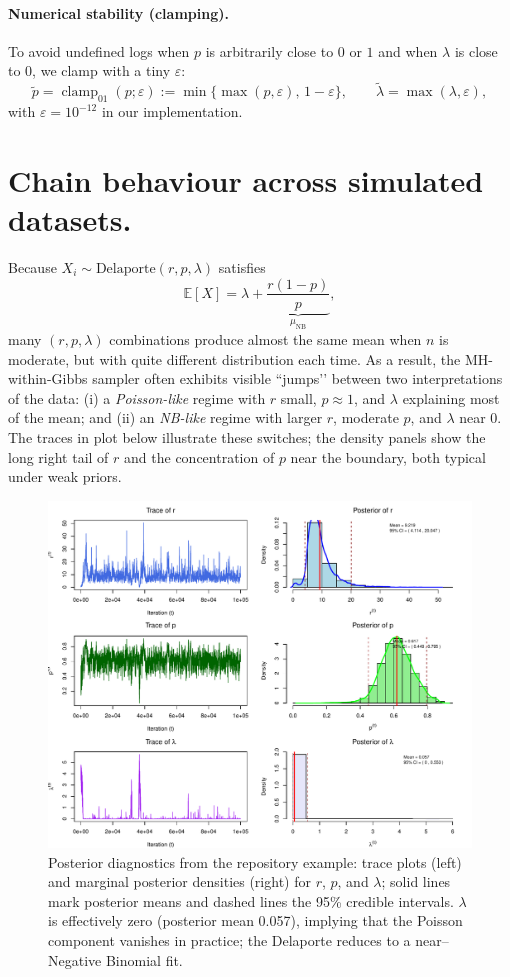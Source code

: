 \documentclass[11pt,a4paper]{article}
\theoremstyle{definition}
\theoremstyle{remark}
\newcommand{\NB}{\mathrm{NB}}
\begin{document}
\begin{enumerate}
    \paragraph{Numerical stability (clamping).}
    To avoid undefined logs when $p$ is arbitrarily close to $0$ or $1$ and when $\lambda$ is close to $0$, we clamp with a tiny $\varepsilon$:
    \[
    \tilde p=\operatorname{clamp}_{01}(p;\varepsilon):=\min\{\max(p,\varepsilon),\,1-\varepsilon\}, 
    \qquad
    \tilde\lambda=\max(\lambda,\varepsilon),
    \]
    with $\varepsilon=10^{-12}$ in our implementation. 
    \end{enumerate}

\section{Chain behaviour across simulated datasets.}
Because $X_i \sim \mathrm{Delaporte}(r,p,\lambda)$ satisfies
\[
\mathbb{E}[X]=\lambda + \underbrace{\frac{r(1-p)}{p}}_{\mu_{\NB}},
\]
many $(r,p,\lambda)$ combinations produce almost the same mean when $n$ is moderate, but with quite different distribution each time.
As a result, the MH-within-Gibbs sampler often exhibits visible ``jumps’’ between two
interpretations of the data:
(i) a \emph{Poisson-like} regime with $r$ small, $p\approx 1$, and $\lambda$ explaining most of
the mean; and
(ii) an \emph{NB-like} regime with larger $r$, moderate $p$, and $\lambda$ near $0$.
    The traces in plot below illustrate these switches; the density panels show the long right tail of $r$
and the concentration of $p$ near the boundary, both typical under weak priors.

\begin{figure}[H]
    \centering
    \includegraphics[width=\linewidth]{posterior_plots.pdf}
    \caption{Posterior diagnostics from the repository example: trace plots (left) and marginal posterior densities (right) for $r$, $p$, and $\lambda$; solid lines mark posterior means and dashed lines the 95\% credible intervals. $λ$ is effectively zero (posterior mean 0.057), implying that the Poisson component vanishes in practice; the Delaporte reduces to a near–Negative Binomial fit. }
\end{figure}
\end{document}
